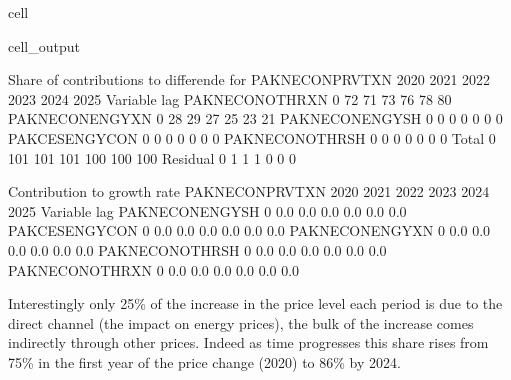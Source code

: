 \documentclass[letterpaper,10pt,english]{jupyterBook}
\begin{document}
\begin{sphinxuseclass}{cell}
\begin{sphinxVerbatimOutput}
\begin{sphinxuseclass}{cell_output}
\begin{sphinxVerbatim}[commandchars=\\\{\}]
 Share of contributions to differende for  PAKNECONPRVTXN
                          2020        2021        2022        2023        2024        2025
Variable       lag                                                                        
PAKNECONOTHRXN 0           72\PYGZpc{}         71\PYGZpc{}         73\PYGZpc{}         76\PYGZpc{}         78\PYGZpc{}         80\PYGZpc{}
PAKNECONENGYXN 0           28\PYGZpc{}         29\PYGZpc{}         27\PYGZpc{}         25\PYGZpc{}         23\PYGZpc{}         21\PYGZpc{}
PAKNECONENGYSH 0            0\PYGZpc{}          0\PYGZpc{}          0\PYGZpc{}          0\PYGZpc{}          0\PYGZpc{}          0\PYGZpc{}
PAKCESENGYCON  0            0\PYGZpc{}          0\PYGZpc{}          0\PYGZpc{}          0\PYGZpc{}          0\PYGZpc{}          0\PYGZpc{}
PAKNECONOTHRSH 0            0\PYGZpc{}          0\PYGZpc{}          0\PYGZpc{}          0\PYGZpc{}          0\PYGZpc{}          0\PYGZpc{}
Total          0          101\PYGZpc{}        101\PYGZpc{}        101\PYGZpc{}        100\PYGZpc{}        100\PYGZpc{}        100\PYGZpc{}
Residual       0            1\PYGZpc{}          1\PYGZpc{}          1\PYGZpc{}          0\PYGZpc{}          0\PYGZpc{}          0\PYGZpc{}

 Contribution to growth rate PAKNECONPRVTXN
                          2020        2021        2022        2023        2024        2025
Variable       lag                                                                        
PAKNECONENGYSH 0          0.0\PYGZpc{}        0.0\PYGZpc{}        0.0\PYGZpc{}        0.0\PYGZpc{}        0.0\PYGZpc{}        0.0\PYGZpc{}
PAKCESENGYCON  0          0.0\PYGZpc{}        0.0\PYGZpc{}        0.0\PYGZpc{}        0.0\PYGZpc{}        0.0\PYGZpc{}        0.0\PYGZpc{}
PAKNECONENGYXN 0          0.0\PYGZpc{}        0.0\PYGZpc{}        0.0\PYGZpc{}        0.0\PYGZpc{}        0.0\PYGZpc{}        0.0\PYGZpc{}
PAKNECONOTHRSH 0          0.0\PYGZpc{}        0.0\PYGZpc{}        0.0\PYGZpc{}        0.0\PYGZpc{}        0.0\PYGZpc{}        0.0\PYGZpc{}
PAKNECONOTHRXN 0          0.0\PYGZpc{}        0.0\PYGZpc{}        0.0\PYGZpc{}        0.0\PYGZpc{}        0.0\PYGZpc{}        0.0\PYGZpc{}
\end{sphinxVerbatim}

\end{sphinxuseclass}\end{sphinxVerbatimOutput}

\end{sphinxuseclass}
\sphinxAtStartPar
Interestingly only 25\% of the increase in the price level each period is due to the direct channel (the impact on energy prices), the bulk of the increase comes indirectly through other prices.  Indeed as time progresses this share rises from 75\% in the first year of the price change (2020) to 86\% by 2024.
\end{document}
